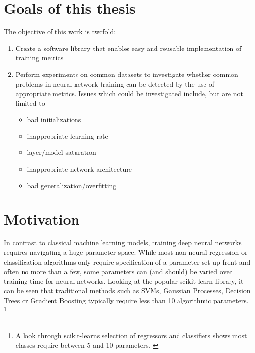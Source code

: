 \hypertarget{sec:thesis-goals}{%
\section{Goals of this thesis}\label{sec:thesis-goals}}

The objective of this work is twofold:

\begin{enumerate}
    \item
        Create a software library that enables easy and reusable
        implementation of training metrics
    \item
        Perform experiments on common datasets to investigate whether common
        problems in neural network training can be detected by the use of
        appropriate metrics. Issues which could be investigated include, but are
        not limited to
        \begin{itemize}
            \item
                bad initializations
            \item
                inappropriate learning rate
            \item
                layer/model saturation
            \item
                inappropriate network architecture
            \item
                bad generalization/overfitting
        \end{itemize}
\end{enumerate}

\hypertarget{sec:motivation}{%
\section{Motivation}\label{sec:motivation}}

In contrast to classical machine learning models, training deep neural networks requires navigating a huge parameter
space. While most non-neural regression or classification algorithms only require specification of a parameter set
up-front and often no more than a few, some parameters can (and should) be varied over training time for neural
networks. Looking at the popular scikit-learn library, it can be seen that traditional methods such as SVMs, Gaussian
Processes, Decision Trees or Gradient Boosting typically require less than 10 algorithmic parameters.
\footnote{A look through \href{http://scikit-learn.org/stable/supervised_learning.html\#supervised-learning}{scikit-learn}s
selection of regressors and classifiers shows most classes require between 5 and 10 parameters. \citep{scikit-learn}}

